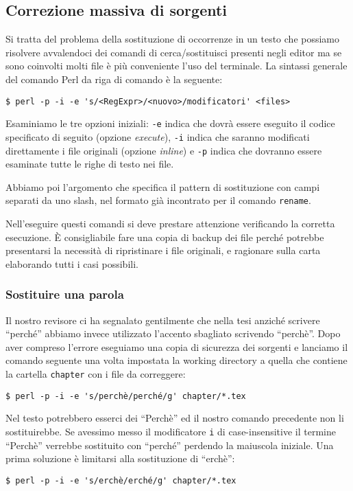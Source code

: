 \subsection{Correzione massiva di sorgenti}

Si tratta del problema della sostituzione di occorrenze in un testo che possiamo risolvere avvalendoci dei comandi di cerca/sostituisci presenti negli editor ma se sono coinvolti molti file è più conveniente l'uso del terminale. La sintassi generale del comando Perl da riga di comando è la seguente:
\begin{verbatim}
$ perl -p -i -e 's/<RegExpr>/<nuovo>/modificatori' <files>
\end{verbatim}

Esaminiamo le tre opzioni iniziali: \texttt{-e} indica che dovrà essere eseguito il codice specificato di seguito (opzione \emph{execute}), \texttt{-i} indica che saranno modificati direttamente i file originali (opzione \emph{inline}) e \texttt{-p} indica che dovranno essere esaminate tutte le righe di testo nei file.

Abbiamo poi l'argomento che specifica il pattern di sostituzione con campi separati da uno slash, nel formato già incontrato per il comando \texttt{rename}.

Nell'eseguire questi comandi si deve prestare attenzione verificando la corretta esecuzione. \`E consigliabile fare una copia di backup dei file perché potrebbe presentarsi la necessità di ripristinare i file originali, e ragionare sulla carta elaborando tutti i casi possibili.


\subsubsection{Sostituire una parola}

Il nostro revisore ci ha segnalato gentilmente che nella tesi anziché scrivere ``perché'' abbiamo invece utilizzato l'accento sbagliato scrivendo ``perchè''. Dopo aver compreso l'errore eseguiamo una copia di sicurezza dei sorgenti e lanciamo il comando seguente una volta impostata la working directory a quella che contiene la cartella \texttt{chapter} con i file da correggere:
\begin{verbatim}
$ perl -p -i -e 's/perchè/perché/g' chapter/*.tex
\end{verbatim}

Nel testo potrebbero esserci dei ``Perchè'' ed il nostro comando precedente non li sostituirebbe. Se avessimo messo il modificatore \texttt{i} di case-insensitive il termine ``Perchè'' verrebbe sostituito con ``perché'' perdendo la maiuscola iniziale.
Una prima soluzione è limitarsi alla sostituzione di ``erchè'':
\begin{verbatim}
$ perl -p -i -e 's/erchè/erché/g' chapter/*.tex
\end{verbatim}

